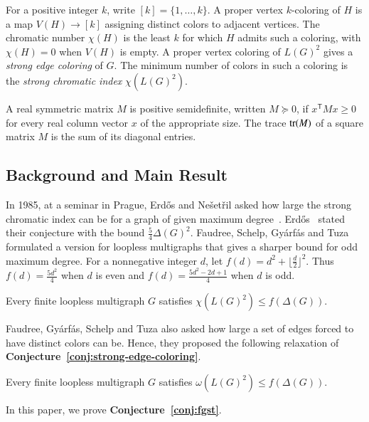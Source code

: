 For a positive integer $k$, write $[k]=\{1,\ldots,k\}$. A proper vertex
$k$-coloring of $H$ is a map $V(H)\to[k]$ assigning distinct colors to
adjacent vertices. The chromatic number $\chi(H)$ is the least $k$ for
which $H$ admits such a coloring, with $\chi(H)=0$ when $V(H)$ is empty.
A proper vertex coloring of $L(G)^2$ gives a \emph{strong edge
coloring} of $G$. The minimum number of colors in such a coloring is
the \emph{strong chromatic index} $\chi(L(G)^2)$.

A real symmetric matrix $M$ is positive semidefinite, written
$M\succeq0$, if $x^{\mathsf T}Mx\geq0$ for every real column vector
$x$ of the appropriate size. The trace $\operatorname{tr}(M)$ of a square matrix
$M$ is the sum of its diagonal entries.

\subsection{Background and Main Result}\label{sec:background}

In 1985, at a seminar in Prague, Erd\H{o}s and Ne\v{s}et\v{r}il asked
how large the strong chromatic index can be for a graph of given
maximum degree~\cite{FGST1989,ErdosNesetril1989}. Erd\H{o}s~\cite{Erdos1988}
stated their conjecture with the bound $\frac{5}{4}\Delta(G)^2$.
Faudree, Schelp, Gy\'arf\'as and Tuza~\cite{FGST1990} formulated a
version for loopless multigraphs that gives a sharper bound for odd
maximum degree. For a nonnegative integer $d$, let
$f(d)=d^2+\lfloor\frac{d}{2}\rfloor^2$. Thus $f(d)=\frac{5d^2}{4}$
when $d$ is even and $f(d)=\frac{5d^2-2d+1}{4}$ when $d$ is odd.

\begin{conjecture}
\label{conj:strong-edge-coloring}
Every finite loopless multigraph $G$ satisfies
$\chi(L(G)^2)\leq f(\Delta(G))$.
\end{conjecture}

Faudree, Gy\'arf\'as, Schelp and Tuza also asked how large a set of edges
forced to have distinct colors can be. Hence, they proposed the following
relaxation of \textbf{Conjecture~\ref{conj:strong-edge-coloring}}.

\begin{conjecture}\label{conj:fgst}
Every finite loopless multigraph $G$ satisfies
$\omega(L(G)^2)\leq f(\Delta(G))$.
\end{conjecture}

In this paper, we prove \textbf{Conjecture~\ref{conj:fgst}}.

